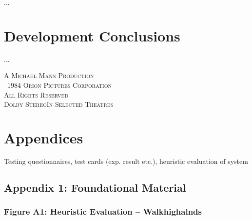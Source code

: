\documentclass[11pt, english]{article}
\begin{document}
	...

\newpage

\section{Development Conclusions}\label{ch8}

	...

	\vspace{\fill}

	\begin{center}
		\textsc{A Michael Mann Production}\\
		\textcopyright\ \textsc{1984 Orion Pictures Corporation}\\
		\small{\textsc{All Rights Reserved}}\\
		\small{\textsc{Dolby Stereo}\texttrademark \textsc{In Selected Theatres}}
	\end{center}

\newpage



\section*{Appendices}

	Testing questionnaires, test cards (exp. result etc.), heuristic evaluation of system

	\subsection*{Appendix 1: Foundational Material}

		\subsubsection*{Figure A1: Heuristic Evaluation -- Walkhighalnds}
\end{document}
